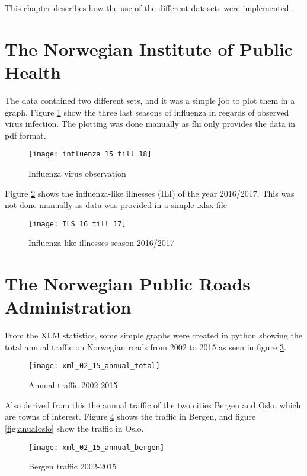 This chapter describes how the use of the different datasets were implemented.

\section{The Norwegian Institute of Public Health}
The data contained two different sets, and it was a simple job to plot them in a graph. Figure \ref{fig:infstat} show the three last seasons of influenza in regards of observed virus infection. The plotting was done manually as fhi only provides the data in pdf format.

\begin{figure}[h]
\texttt{[image: influenza\_15\_till\_18]}
\centering
\caption{Influenza virus observation}
\label{fig:infstat}
\end{figure}

Figure \ref{fig:ilsstat} shows the influenza-like illnesses (ILI) of the year 2016/2017. This was not done manually as data was provided in a simple .xlsx file 

\begin{figure}[ht]
\texttt{[image: ILS\_16\_till\_17]}
\centering
\caption{Influenza-like illnesses season 2016/2017}
\label{fig:ilsstat}
\end{figure}

\newpage

\section{The Norwegian Public Roads Administration}
From the XLM statistics, some simple graphs were created in python showing the total annual traffic on Norwegian roads from 2002 to 2015 as seen in figure \ref{fig:anualtotal}. 

\begin{figure}[ht]
\texttt{[image: xml\_02\_15\_annual\_total]}
\centering
\caption{Annual traffic 2002-2015}
\label{fig:anualtotal}
\end{figure}

Also derived from this the annual traffic of the two cities Bergen and Oslo, which are towns of interest. Figure \ref{fig:anualbergen} shows the traffic in Bergen, and figure \ref{fig:anualoslo} show the traffic in Oslo.

\begin{figure}[ht]
\texttt{[image: xml\_02\_15\_annual\_bergen]}
\centering
\caption{Bergen traffic 2002-2015}
\label{fig:anualbergen}
\end{figure}

